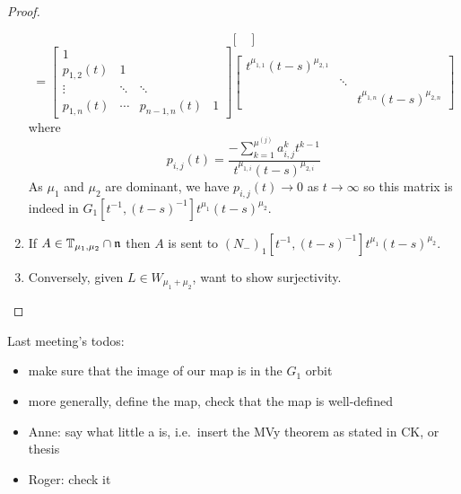 \documentclass{article}
\begin{document}
\begin{proof}
\begin{enumerate}[label = Step \arabic*:]
\[\begin{bmatrix}
\end{bmatrix}
\]
\[
= \begin{bmatrix}
    1 \\
    p_{1,2}(t) & 1 \\
    \vdots & \ddots & \ddots \\
    p_{1,n}(t) & \cdots & p_{n-1,n}(t) & 1
\end{bmatrix}
\begin{bmatrix}
    t^{\mu_{1,1}}(t-s)^{\mu_{2,1}} \\
     & \ddots \\
     & & t^{\mu_{1,n}} (t-s)^{\mu_{2,n}}
\end{bmatrix}
\]
where 
\[p_{i,j}(t) = \frac{-\sum_{k=1}^{\mu^{(j)}} a_{i,j}^k t^{k-1}} {t^{\mu_{1,i}} (t-s)^{\mu_{2,i}}}\]
As $\mu_1$ and $\mu_2$ are dominant, we have $p_{i,j}(t) \rightarrow 0$ as $t \rightarrow \infty$ so this matrix is indeed in $G_1[t^{-1},(t-s)^{-1}]t^{\mu_1}(t-s)^{\mu_2}$.

    \item If $A \in \mathbb T_{\mu_1,\mu_2} \cap \mathfrak n$ then $A$ is sent to $(N_-)_1[t^{-1}, (t-s)^{-1}] t^{\mu_1} (t-s)^{\mu_2}$. 

    \item Conversely, given $L \in W_{\mu_1 + \mu_2}$, want to show surjectivity.
\end{enumerate}
\end{proof}

Last meeting's todos:
\begin{itemize}
    \item make sure that the image of our map is in the $G_1$ orbit
    \item more generally, define the map, check that the map is well-defined
    \item Anne: say what little a is, i.e.\ insert the MVy theorem as stated in CK, or thesis
    \item Roger: check it
\end{itemize}





\end{document}
